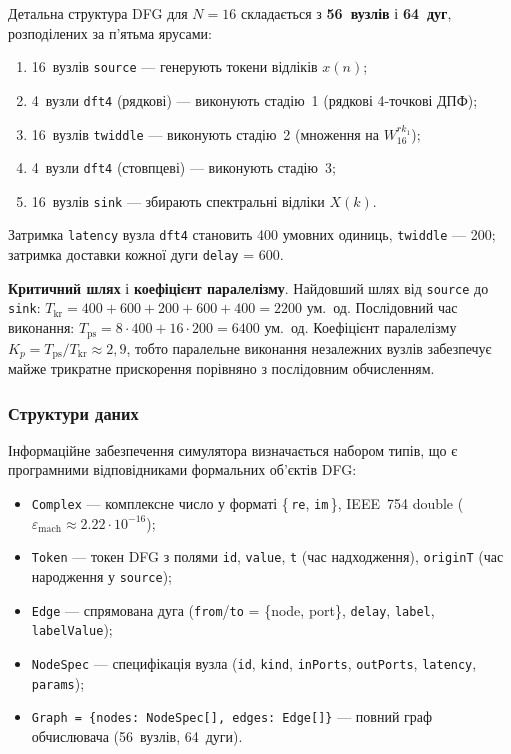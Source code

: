 \documentclass[14pt,a4paper]{extarticle}
\begin{document}
Детальна структура DFG для $N = 16$ складається з \textbf{56~вузлів}
і \textbf{64~дуг}, розподілених за п'ятьма ярусами:

\begin{enumerate}
  \item 16~вузлів \texttt{source} --- генерують токени відліків $x(n)$;
  \item 4~вузли \texttt{dft4} (рядкові) --- виконують стадію~1
        (рядкові 4-точкові ДПФ);
  \item 16~вузлів \texttt{twiddle} --- виконують стадію~2 (множення
        на $W_{16}^{r k_1}$);
  \item 4~вузли \texttt{dft4} (стовпцеві) --- виконують стадію~3;
  \item 16~вузлів \texttt{sink} --- збирають спектральні відліки $X(k)$.
\end{enumerate}

Затримка \texttt{latency} вузла \texttt{dft4} становить 400 умовних
одиниць, \texttt{twiddle} --- 200; затримка доставки кожної дуги
\texttt{delay} = 600.

\textbf{Критичний шлях} і \textbf{коефіцієнт паралелізму}.
Найдовший шлях від \texttt{source} до \texttt{sink}:
$T_{\mathrm{kr}} = 400 + 600 + 200 + 600 + 400 = 2200$ ум.~од.
Послідовний час виконання: $T_{\mathrm{ps}} = 8 \cdot 400 + 16 \cdot
200 = 6400$ ум.~од. Коефіцієнт паралелізму
$K_p = T_{\mathrm{ps}} / T_{\mathrm{kr}} \approx 2{,}9$, тобто
паралельне виконання незалежних вузлів забезпечує майже трикратне
прискорення порівняно з послідовним обчисленням.

\subsubsection*{Структури даних}

Інформаційне забезпечення симулятора визначається набором типів,
що є програмними відповідниками формальних об'єктів DFG:

\begin{itemize}
  \item \texttt{Complex} --- комплексне число у форматі
        \{\,\texttt{re}, \texttt{im}\,\}, IEEE~754 double
        ($\varepsilon_{\mathrm{mach}} \approx 2.22 \cdot 10^{-16}$);
  \item \texttt{Token} --- токен DFG з полями
        \texttt{id}, \texttt{value}, \texttt{t} (час надходження),
        \texttt{originT} (час народження у \texttt{source});
  \item \texttt{Edge} --- спрямована дуга
        (\texttt{from}/\texttt{to} = \{node, port\}, \texttt{delay},
        \texttt{label}, \texttt{labelValue});
  \item \texttt{NodeSpec} --- специфікація вузла
        (\texttt{id}, \texttt{kind}, \texttt{inPorts},
        \texttt{outPorts}, \texttt{latency}, \texttt{params});
  \item \texttt{Graph = \{nodes: NodeSpec[], edges: Edge[]\}} ---
        повний граф обчислювача (56~вузлів, 64~дуги).
\end{itemize}
\end{document}
